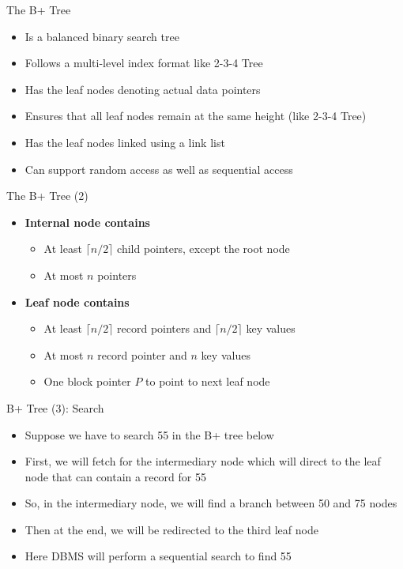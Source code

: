 \documentclass[aspectratio=169, xcolor=dvipsnames]{beamer}
\begin{document}
\begin{frame}{The B+ Tree}
    \begin{itemize}[<+->]
        \item Is a balanced binary search tree
        \item Follows a multi-level index format like 2-3-4 Tree
        \item Has the leaf nodes denoting actual data pointers
        \item Ensures that all leaf nodes remain at the same height (like 2-3-4 Tree)
        \item Has the leaf nodes linked using a link list
        \item Can support random access as well as sequential access
    \end{itemize}
\end{frame}

\begin{frame}{The B+ Tree (2)}
    \begin{itemize}[<+->]
        \item \textbf{Internal node contains}
        \begin{itemize}[<+->]
            \item At least $\lceil n/2 \rceil$ child pointers, except the root node
            \item At most $n$ pointers
        \end{itemize}
        \item \textbf{Leaf node contains}
        \begin{itemize}[<+->]
            \item At least $\lceil n/2 \rceil$ record pointers and $\lceil n/2 \rceil$ key values
            \item At most $n$ record pointer and $n$ key values
            \item One block pointer $P$ to point to next leaf node
        \end{itemize}
    \end{itemize}
\end{frame}

\begin{frame}{B+ Tree (3): Search}
    \begin{itemize}[<+->]
        \item Suppose we have to search 55 in the B+ tree below
        \item First, we will fetch for the intermediary node which will direct to the leaf node that can contain a record for 55
        \item So, in the intermediary node, we will find a branch between 50 and 75 nodes
        \item Then at the end, we will be redirected to the third leaf node
        \item Here DBMS will perform a sequential search to find 55
    \end{itemize}
\end{frame}
\end{document}

